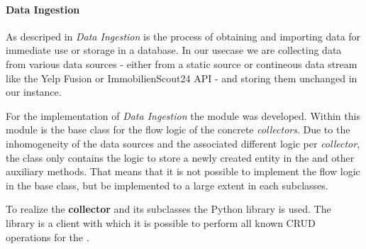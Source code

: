 \paragraph{Data Ingestion}
\label{par:ingestion}
As descriped in\cite{ingestion} \textit{Data Ingestion} is the process of obtaining and importing data for immediate use or storage in a database.
In our usecase we are collecting data from various data sources - either from a static source or contineous data stream like the Yelp Fusion or ImmobilienScout24 \ac{API} - and storing them unchanged in our \gds{} instance.

For the implementation of \textit{Data Ingestion} the  module was developed.
Within this module is the base class for the flow logic of the concrete \textit{collectors}.
Due to the inhomogeneity of the data sources and the associated different logic per \textit{collector}, the  class only contains the logic
to store a newly created entity in the \gds{} and other auxiliary methods.
That means that it is not possible to implement the flow logic in the base class, but be implemented to a large extent in each subclasses.

To realize the \textbf{collector} and its subclasses the Python library  is used.
The library  is a client with which it is possible to perform all known \ac{CRUD} operations for the \gds{}.
